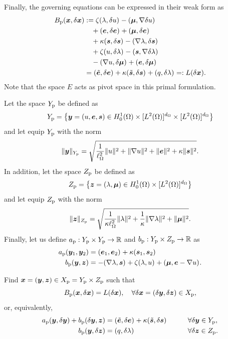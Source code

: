 Finally, the governing equations can be expressed in their weak form as
%
\begin{align*}
\Bp(\xF,\delta \xF)
&:=     \zeta\iprod[]{      \lF}{\delta\uF}-\iprod[]{      \mF}{\nabla\delta\uF}\\
&\quad      +\iprod[]{      \eF}{\delta\eF}+\iprod[]{      \mF}{      \delta\eF}\\
&\quad+\kappa\iprod[]{      \sF}{\delta\sF}-\iprod[]{\nabla\lF}{      \delta\sF}\\
&\quad+ \zeta\iprod[]{      \uF}{\delta\lF}-\iprod[]{      \sF}{\nabla\delta\lF}\\
&\quad      -\iprod[]{\nabla\uF}{\delta\mF}+\iprod[]{      \eF}{      \delta\mF}\\
&= \iprod[]{\eFt}{\delta\eF}+\kappa\iprod[]{\sFt}{\delta\sF}+\iprod[]{q}{\delta\lF} =: L(\delta \xF). 
\end{align*}
Note that the space $E$
acts as pivot space in this primal formulation.

\begin{definition}

Let the space $\YSp$ be defined as
$$\YSp = \left\lbrace\yF = (\uF,\eF,\sF)\in\Honez\times[\Ltwo]^\dimo\times[\Ltwo]^\dimo\right\rbrace$$
and let equip $\YSp$ with the norm
$$
\norm[Y_\textrm{p}]{\yF} = \sqrt{
\frac{1}{\length^2}\norm[]{\uF}^2+
                   \norm[]{\nabla \uF}^2+
                   \norm[]{\eF}^2+
             \kappa\norm[]{\sF}^2}.
$$
In addition, let the space $\ZSp$ be defined as
$$\ZSp = \left\lbrace\zF = (\lF,\mF)\in\Honez\times[\Ltwo]^\dimo\right\rbrace$$
and let equip $\ZSp$ with the norm
$$
\norm[\ZSp]{\zF} = \sqrt{
\frac{1}{\kappa\length^2}\norm[]{\lF}^2+
\frac{1}{\kappa}         \norm[]{\nabla\lF}^2+
                         \norm[]{\mF}^2}.
$$
Finally, let us define $\ap: \YSp\times\YSp\rightarrow \mathbb{R}$ and $\bp : \YSp\times \ZSp \rightarrow \mathbb{R}$ as
\begin{align}
\ap(\yF_1,\yF_2) & = \iprod[]{\eF_1}{\eF_2} + \kappa \iprod[]{\sF_1}{\sF_2}  \label{eq:defap}\\
\bp(\yF,\zF) & = -\iprod[]{\nabla\lF}{\sF}+\zeta\iprod[]{\lF}{\uF}+\iprod[]{\mF}{\eF-\nabla\uF}.\label{eq:defbp}
\end{align}
\end{definition}

\begin{problem}[$\Pp$] Find $\xF = (\yF,\zF)\in\XSp = \YSp\times\ZSp$ such that
\begin{equation}
\Bp(\xF,\delta\xF) = L(\delta\xF),\quad\forall\delta\xF = (\delta\yF, \delta \zF)\in\XSp, 
\end{equation} 
or, equivalently,
\begin{alignat}{3}
\ap(\yF,\delta\yF) + \bp(\delta \yF,\zF) & = 
\iprod[]{\eFt}{\delta\eF}+\kappa\iprod[]{\sFt}{\delta\sF}\qquad && \forall \delta \yF\in \YSp,\nonumber\\
\bp(\yF,\delta\zF) & = \iprod[]{q}{\delta\lF} && \forall \delta \zF\in \ZSp.\nonumber
\end{alignat}
\end{problem}

